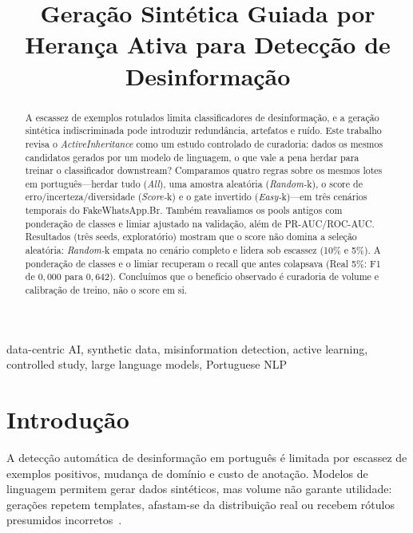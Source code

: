 \documentclass[conference]{IEEEtran}
\begin{document}
\title{Geração Sintética Guiada por Herança Ativa para Detecção de Desinformação}

\author{
}

\maketitle

\begin{abstract}
A escassez de exemplos rotulados limita classificadores de desinformação, e a geração sintética indiscriminada pode introduzir redundância, artefatos e ruído. Este trabalho revisa o \emph{ActiveInheritance} como um estudo controlado de curadoria: dados os mesmos candidatos gerados por um modelo de linguagem, o que vale a pena herdar para treinar o classificador downstream? Comparamos quatro regras sobre os mesmos lotes em português---herdar tudo (\emph{All}), uma amostra aleatória (\emph{Random-}k), o score de erro/incerteza/diversidade (\emph{Score-}k) e o gate invertido (\emph{Easy-}k)---em três cenários temporais do FakeWhatsApp.Br. Também reavaliamos os pools antigos com ponderação de classes e limiar ajustado na validação, além de PR-AUC/ROC-AUC. Resultados (três seeds, exploratório) mostram que o score não domina a seleção aleatória: \emph{Random-}k empata no cenário completo e lidera sob escassez (10\% e 5\%). A ponderação de classes e o limiar recuperam o recall que antes colapsava (Real 5\%: F1 de $0{,}000$ para $0{,}642$). Concluímos que o benefício observado é curadoria de volume e calibração de treino, não o score em si.
\end{abstract}

\begin{IEEEkeywords}
data-centric AI, synthetic data, misinformation detection, active learning, controlled study, large language models, Portuguese NLP
\end{IEEEkeywords}

\section{Introdução}

A detecção automática de desinformação em português é limitada por escassez de exemplos positivos, mudança de domínio e custo de anotação. Modelos de linguagem permitem gerar dados sintéticos, mas volume não garante utilidade: gerações repetem templates, afastam-se da distribuição real ou recebem rótulos presumidos incorretos~\cite{shumailov2024}.
\end{document}

